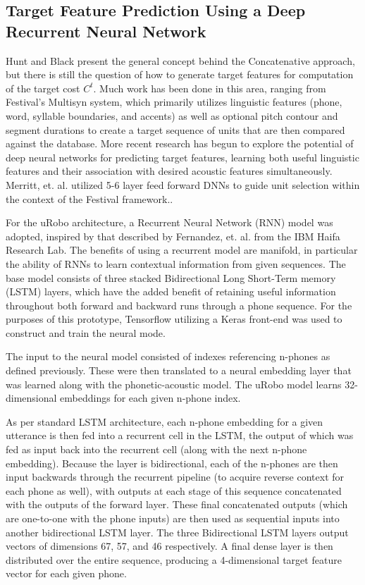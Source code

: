 \documentclass[10pt, journal, compsoc]{IEEEtran}
\begin{document}
\subsection{Target Feature Prediction Using a Deep Recurrent Neural Network}
Hunt and Black present the general concept behind the Concatenative approach, but there is still the question of how to generate target features for computation of the target cost $C^t$. Much work has been done in this area, ranging from Festival's Multisyn system, which primarily utilizes linguistic features (phone, word, syllable boundaries, and accents)\cite{a102c4924c19470ab180d278d2029de5} as well as optional pitch contour and segment durations to create a target sequence of units that are then compared against the database. More recent research has begun to explore the potential of deep neural networks for predicting target features, learning both useful linguistic features and their association with desired acoustic features simultaneously. Merritt, et. al. utilized 5-6 layer feed forward DNNs to guide unit selection within the context of the Festival framework.\cite{7472658}.\par
For the uRobo architecture, a Recurrent Neural Network (RNN) model was adopted, inspired by that described by Fernandez, et. al. from the IBM Haifa Research Lab. The benefits of using a recurrent model are manifold, in particular the ability of RNNs to learn contextual information from given sequences. The base model consists of three stacked Bidirectional Long Short-Term memory (LSTM) layers, which have the added benefit of retaining useful information throughout both forward and backward runs through a phone sequence.\cite{unknowndnn} For the purposes of this prototype, Tensorflow utilizing a Keras front-end was used to construct and train the neural mode. \par
The input to the neural model consisted of indexes referencing n-phones as defined previously. These were then translated to a neural embedding layer that was learned along with the phonetic-acoustic model. The uRobo model learns 32-dimensional embeddings for each given n-phone index. 
\par As per standard LSTM architecture, each n-phone embedding for a given utterance is then fed into a recurrent cell in the LSTM, the output of which was fed as input back into the recurrent cell (along with the next n-phone embedding). Because the layer is bidirectional, each of the n-phones are then input backwards through the recurrent pipeline (to acquire reverse context for each phone as well), with outputs at each stage of this sequence concatenated with the outputs of the forward layer. These final concatenated outputs (which are one-to-one with the phone inputs) are then used as sequential inputs into another bidirectional LSTM layer. The three Bidirectional LSTM layers output vectors of dimensions 67, 57, and 46 respectively.\cite{unknowndnn} A final dense layer is then distributed over the entire sequence, producing a 4-dimensional target feature vector for each given phone.
\end{document}

